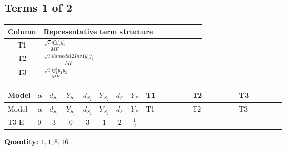 \documentclass[8pt]{article}
\begin{document}
\begin{landscape}
\subsection*{Terms 1 of 2}
\begin{center}
\begin{tabular}{@{}c >{\raggedright\arraybackslash}p{0.82\linewidth}@{}}
\toprule
Column & Representative term structure \\
\midrule
T1 & \(\displaystyle \frac{\sqrt{3} g_{2}^{2} \overline{y_{1}} \overline{y_{2}}}{MF}\) \\
\midrule
T2 & \(\displaystyle \frac{\sqrt{3} i lambda12Inv1 \overline{y_{1}} \overline{y_{2}}}{MF}\) \\
\midrule
T3 & \(\displaystyle \frac{\sqrt{3} i g_{1}^{2} \overline{y_{1}} \overline{y_{2}}}{MF}\) \\
\midrule
\bottomrule
\end{tabular}
\end{center}
\smallskip
\tiny
\begin{longtable}{@{}llcccccc >{\raggedright\arraybackslash}p{0.21\linewidth} >{\raggedright\arraybackslash}p{0.21\linewidth} >{\raggedright\arraybackslash}p{0.21\linewidth}@{}}
\toprule
Model & $\alpha$ & $d_{S_1}$ & $Y_{S_1}$ & $d_{S_2}$ & $Y_{S_2}$ & $d_F$ & $Y_F$ & T1 & T2 & T3 \\
\midrule
\endfirsthead
\toprule
Model & $\alpha$ & $d_{S_1}$ & $Y_{S_1}$ & $d_{S_2}$ & $Y_{S_2}$ & $d_F$ & $Y_F$ & T1 & T2 & T3 \\
\midrule
\endhead
T3-E & $0$ & $3$ & $0$ & $3$ & $1$ & $2$ & $\frac{1}{2}$ & \scriptsize\adjustbox{max width=\linewidth}{$\begin{gathered} \frac{\sqrt{3} g_{2}^{2} \overline{y_{1}} \overline{y_{2}}}{6 MF}\end{gathered}$} & \scriptsize\adjustbox{max width=\linewidth}{$\begin{gathered} - \frac{\sqrt{3} i lambda12Inv1 \overline{y_{1}} \overline{y_{2}}}{6 MF}\end{gathered}$} & \scriptsize\adjustbox{max width=\linewidth}{$\begin{gathered} \frac{\sqrt{3} i g_{1}^{2} \overline{y_{1}} \overline{y_{2}}}{8 MF}\end{gathered}$} \\
\midrule
\bottomrule
\end{longtable}
\clearpage
\noindent\textbf{Quantity: }$\mathrm{1,1,8,16}$\par\smallskip

\end{landscape}
\end{document}
